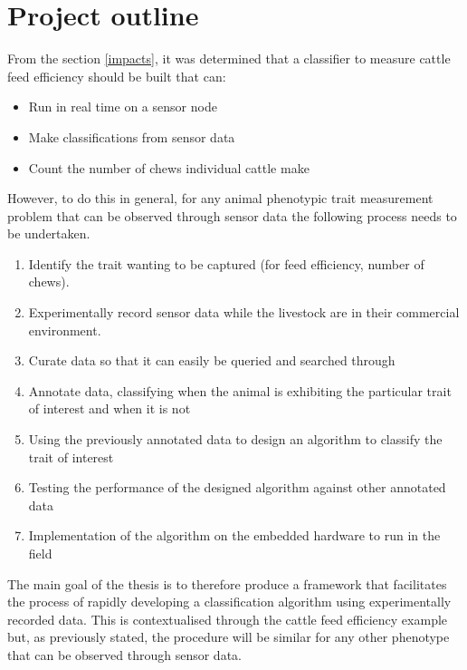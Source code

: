 \chapter{Project outline}

From the section \ref{impacts}, it was determined that a classifier to measure cattle feed efficiency should be built that can:

\begin{itemize}
\item Run in real time on a sensor node
\item Make classifications from sensor data
\item Count the number of chews individual cattle make
\end{itemize}

However, to do this in general, for any animal phenotypic trait measurement problem that can be observed through sensor data the following process needs to be undertaken. 

\begin{enumerate}
\item Identify the trait wanting to be captured (for feed efficiency, number of chews).

\item Experimentally record sensor data while the livestock are in their commercial environment. 

\item Curate data so that it can easily be queried and searched through

\item Annotate data, classifying when the animal is exhibiting the particular trait of interest and when it is not

\item Using the previously annotated data to design an algorithm to classify the trait of interest

\item Testing the performance of the designed algorithm against other annotated data

\item Implementation of the algorithm on the embedded hardware to run in the field
\end{enumerate}

The main goal of the thesis is to therefore produce a framework that facilitates the process of rapidly developing a classification algorithm using experimentally recorded data. This is contextualised through the cattle feed efficiency example but, as previously stated, the procedure will be similar for any other phenotype that can be observed through sensor data.

